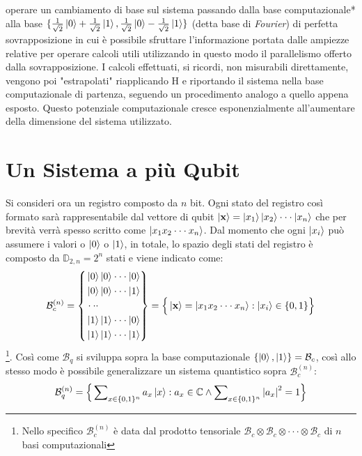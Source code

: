 \documentclass[12pt,a4paper,openright]{report}
\begin{document}
operare un cambiamento di base \cite{ref8} sul sistema passando dalla base computazionale* alla base $\{\frac{1}{\sqrt2}\ket0 + \frac{1}{\sqrt2}\ket1, \frac{1}{\sqrt2}\ket0 - \frac{1}{\sqrt2}\ket1\}$ (detta base di \emph{Fourier}) di
perfetta sovrapposizione in cui è possibile sfruttare l'informazione portata dalle ampiezze relative per operare calcoli utili utilizzando in questo modo il parallelismo offerto dalla sovrapposizione. I calcoli effettuati,
si ricordi, non misurabili direttamente, vengono poi "estrapolati" riapplicando H e riportando il sistema nella base computazionale di partenza, seguendo un procedimento analogo a quello appena esposto.
Questo potenziale computazionale cresce esponenzialmente all'aumentare della dimensione del sistema utilizzato.

\section{Un Sistema a più Qubit}
Si consideri ora un registro composto da $n$ bit.
Ogni stato del registro così formato sarà rappresentabile dal vettore di qubit $\ket{\textbf{x}}= \ket{x_1}\ket{x_2}\cdot\cdot\cdot\ket{x_n}$ che per brevità verrà spesso scritto come $\ket{x_1 x_2 \cdot\cdot\cdot x_n}$.
Dal momento che ogni $\ket{x_i}$ può assumere i valori o $\ket0$ o $\ket1$, in totale, lo spazio degli stati del registro è composto da $\mathbb{D}_{2,n}=2^n$ stati e viene indicato come:
\begin{equation*}
    \mathcal{B}_c^{(n)} = \left\{ 
    \begin{aligned}
        & \ket0 \ket0 \cdot \cdot \cdot \ket0 \\
        & \ket0 \ket0 \cdot \cdot \cdot \ket1 \\
        & \cdot\cdot\cdot \\
        & \ket1 \ket1 \cdot \cdot \cdot \ket0 \\
        & \ket1 \ket1 \cdot \cdot \cdot \ket1
    \end{aligned}
    \right\} = \Big\{\ket{\textbf{x}}=\ket{x_1 x_2 \cdot \cdot \cdot x_n} : \ket{x_i} \in \{0,1\} \Big\}
\end{equation*}
\footnote{Nello specifico $\mathcal{B}_c^{(n)}$ è data dal prodotto tensoriale $\mathcal{B}_c \otimes \mathcal{B}_c \otimes \cdot\cdot\cdot \otimes \mathcal{B}_c$ di $n$ basi computazionali }. Così come $\mathcal{B}_q$ si sviluppa sopra la base computazionale $\{\ket0, \ket1 \}= \mathcal{B}_c$, così allo stesso modo è possibile generalizzare un sistema quantistico sopra $\mathcal{B}_c^{(n)}$:
\[
    \mathcal{B}_q^{(n)} = \Big\{ \sum\nolimits_{x \in \{0,1\}^{n}} a_x \ket{x} : a_x \in \mathbb{C} \land \sum\nolimits_{x\in\{0,1\}^{n}} {\left\vert{a_x}\right\vert}^2 = 1\Big\}
\]
\end{document}
